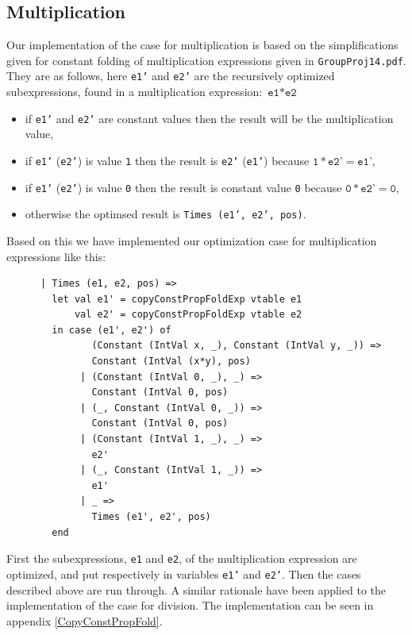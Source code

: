 \documentclass[11pt]{article}
\begin{document}
	\subsection{Multiplication}
	Our implementation of the case for multiplication is based on the simplifications
	given for constant folding of multiplication expressions given in \texttt{GroupProj14.pdf}.
	They are as follows, here \texttt{e1'} and \texttt{e2'} are the recursively optimized
	subexpressions, found in a multiplication expression: $ \texttt{e1} \ast \texttt{e2}$
	\begin{itemize}
	\item if \texttt{e1'} and \texttt{e2'} are constant values then the result will be the
			multiplication value,
	\item if \texttt{e1'} (\texttt{e2'}) is value \texttt{1} then the result is \texttt{e2'}
			(\texttt{e1'}) because $\texttt{1} \ast \texttt{e2'} = \texttt{e1'}$,
	\item if \texttt{e1'} (\texttt{e2'}) is value \texttt{0} then the result is constant value
			\texttt{0} because $\texttt{0} \ast \texttt{e2'} = \texttt{0}$,
	\item otherwise the optimsed result is  \texttt{Times (e1', e2', pos)}.
	\end{itemize}
	Based on this we have implemented our optimization case for multiplication expressions like this:
	\begin{lstlisting}
      | Times (e1, e2, pos) =>
        let val e1' = copyConstPropFoldExp vtable e1
            val e2' = copyConstPropFoldExp vtable e2
        in case (e1', e2') of
               (Constant (IntVal x, _), Constant (IntVal y, _)) =>
               Constant (IntVal (x*y), pos)
             | (Constant (IntVal 0, _), _) =>
               Constant (IntVal 0, pos)
             | (_, Constant (IntVal 0, _)) =>
               Constant (IntVal 0, pos)
             | (Constant (IntVal 1, _), _) =>
               e2'
             | (_, Constant (IntVal 1, _)) =>
               e1'
             | _ =>
               Times (e1', e2', pos)
        end
	\end{lstlisting}
	First the subexpressions, \texttt{e1} and \texttt{e2}, of the multiplication expression are
	optimized, and put respectively in variables \texttt{e1'} and \texttt{e2'}.
	Then the cases described above are run through. A similar rationale have been applied to the
	implementation of the case for division. The implementation can be seen in appendix \ref{CopyConstPropFold}.
\end{document}

